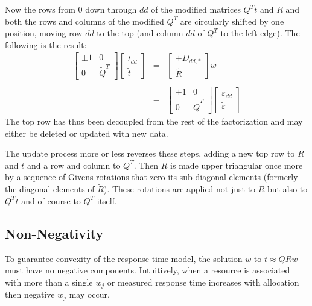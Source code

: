 Now the rows from 0 down through $dd$ of the modified matrices $Q^Tt$ and $R$ and both the rows and columns of the modified $Q^T$
are circularly shifted by one position, moving row $dd$ to the top (and column $dd$ of $Q^T$ to the left edge).
The following is the result:
\begin{displaymath}
\begin{array}{lll}
    \left[\begin{array}{cc}
      \pm1  &  0 \\
      0     &  \tilde{Q}^T
   \end{array}\right]
   \left[\begin{array}{c}
      t_{dd} \\
      \tilde{t}
   \end{array}\right]
   &=&
   \left[\begin{array}{c}
      \pm D_{dd,*} \\
      \tilde{R}
   \end{array}\right] w
   \\
   \\
   &-&
   \left[\begin{array}{cc}
      \pm1  &  0 \\
      0     &  \tilde{Q}^T
   \end{array}\right]
   \left[\begin{array}{c}
      \varepsilon_{dd} \\
      \tilde{\varepsilon}
   \end{array}\right]
\end{array}
\end{displaymath}
The top row has thus been decoupled from the rest of the factorization and may either be deleted or updated with new data.

The update process more or less reverses these steps, adding a new top row to $R$ and $t$ and a row and column to $Q^T$.
Then $R$ is made upper triangular once more by a sequence of Givens rotations that zero its sub-diagonal elements
(formerly the diagonal elements of $\tilde{R}$).
These rotations are applied not just to $R$ but also to $Q^Tt$ and of course to $Q^T$ itself.

\subsection*{Non-Negativity}

To guarantee convexity of the response time model, the solution $w$ to $t \approx QRw$ must have no negative components.
Intuitively, when a resource is associated with more than a single $w_j$
or measured response time increases with allocation then negative $w_j$ may occur.


